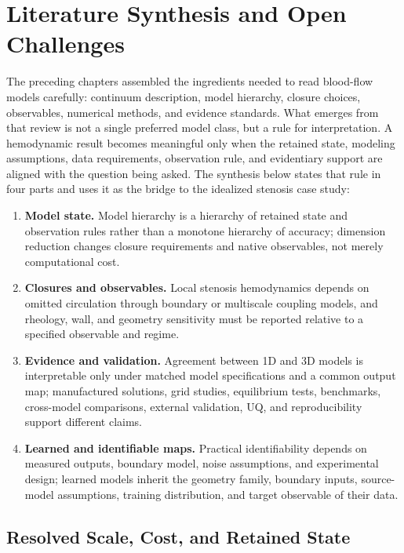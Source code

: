 \section{Literature Synthesis and Open Challenges}
\label{sec:literature-synthesis}
\label{sec:literature-synthesis-open-challenges}

The preceding chapters assembled the ingredients needed to read blood-flow
models carefully: continuum description, model hierarchy, closure choices,
observables, numerical methods, and evidence standards. What emerges from that
review is not a single preferred model class, but a rule for interpretation. A
hemodynamic result becomes meaningful only when the retained state, modeling
assumptions, data requirements, observation rule, and evidentiary support are
aligned with the question being asked. The synthesis below states that rule in
four parts and uses it as the bridge to the idealized stenosis case study:
\begin{enumerate}
    \item \textbf{Model state.} Model hierarchy is a hierarchy of retained
    state and observation rules rather than a monotone hierarchy of accuracy;
    dimension reduction changes closure requirements and native observables,
    not merely computational cost.
    \item \textbf{Closures and observables.} Local stenosis hemodynamics depends
    on omitted circulation through boundary or multiscale coupling models, and
    rheology, wall, and geometry sensitivity must be reported relative to a
    specified observable and regime.
    \item \textbf{Evidence and validation.} Agreement between 1D and 3D models
    is interpretable only under matched model specifications and a common
    output map; manufactured solutions, grid studies, equilibrium tests,
    benchmarks, cross-model comparisons, external validation, UQ, and
    reproducibility support different claims.
    \item \textbf{Learned and identifiable maps.} Practical identifiability
    depends on measured outputs, boundary model, noise assumptions, and
    experimental design; learned models inherit the geometry family, boundary
    inputs, source-model assumptions, training distribution, and target
    observable of their data.
\end{enumerate}

\subsection{Resolved Scale, Cost, and Retained State}
\label{subsec:synthesis-fidelity-identifiability-observables}

